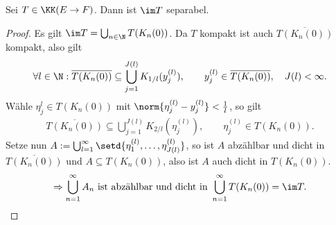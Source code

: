 \begin{lem}
\label{prop:6.21}
Sei $T\in \KK(E\to F)$. Dann ist $\im T$ separabel.\fishhere
\end{lem}
\begin{proof}
Es gilt $\im T = \bigcup_{n\in\N} T(K_n(0))$. Da $T$ kompakt ist auch
$\overline{T(K_n(0))}$ kompakt, also gilt
\begin{align*}
\forall l\in \N : \overline{T(K_n(0))} \subseteq \bigcup_{j=1}^{J(l)}
K_{1/l}(y_j^{(l)}),\qquad y_j^{(l)}\in \overline{T(K_n(0))},\quad J(l) < \infty.
\end{align*}
Wähle $\eta_j^{l}\in T(K_n(0))$ mit $\norm{\eta_j^{(l)}-y_j^{(l)}} <
\frac{1}{l}$, so gilt
\begin{align*}
\overline{T(K_n(0))} \subseteq \bigcup_{j=1}^{J(l)} K_{2/l}(\eta_j^{(l)}),\qquad
\eta_j^{(l)}\in T(K_n(0)).
\end{align*}
Setze nun $A:= \bigcup_{l=1}^\infty
\setd{\eta_1^{(l)},\ldots,\eta_{J(l)}^{(l)}}$, so ist $A$ abzählbar und dicht
in $\overline{T(K_n(0))}$ und $A\subseteq T(K_n(0))$, also ist $A$ auch dicht
in $T(K_n(0))$.
\begin{align*}
\Rightarrow \bigcup_{n=1}^\infty A_n \text{ ist abzählbar und dicht in
}\bigcup_{n=1}^\infty T(K_n(0)) = \im T.\qedhere
\end{align*}
\end{proof}

